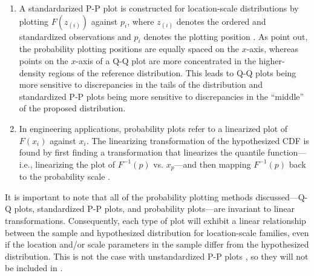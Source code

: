 \begin{enumerate}
\def\labelenumi{\arabic{enumi}.}
\tightlist
\item
  A standardarized P-P plot is constructed for location-scale
  distributions by plotting \(F(z_{(i)})\) against \(p_i\), where
  \(z_{(i)}\) denotes the ordered and standardized observations and
  \(p_i\) denotes the plotting position \citep{Gan1991-yk}. As
  \citet{Gan1991-yk} point out, the probability plotting positions are
  equally spaced on the \(x\)-axis, whereas points on the \(x\)-axis of
  a Q-Q plot are more concentrated in the higher-density regions of the
  reference distribution. This leads to Q-Q plots being more sensitive
  to discrepancies in the tails of the distribution and standardized P-P
  plots being more sensitive to discrepancies in the ``middle'' of the
  proposed distribution.
\item
  In engineering applications, probability plots refer to a linearized
  plot of \(F(x_i)\) against \(x_i\). The linearizing transformation of
  the hypothesized CDF is found by first finding a transformation that
  linearizes the quantile function---i.e., linearizing the plot of
  \(F^{-1}(p)\) vs. \(x_p\)---and then mapping \(F^{-1}(p)\) back to the
  probability scale \citep[cf.][Chapter 6]{Meeker1998}.
\end{enumerate}

It is important to note that all of the probability plotting methods
discussed---Q-Q plots, standardized P-P plots, and probability
plots---are invariant to linear transformations. Consequently, each type
of plot will exhibit a linear relationship between the sample and
hypothesized distribution for location-scale families, even if the
location and/or scale parameters in the sample differ from the
hypothesized distribution. This is not the case with unstandardized P-P
plots \citep{Wilk1968-ii}, so they will not be included in
.


